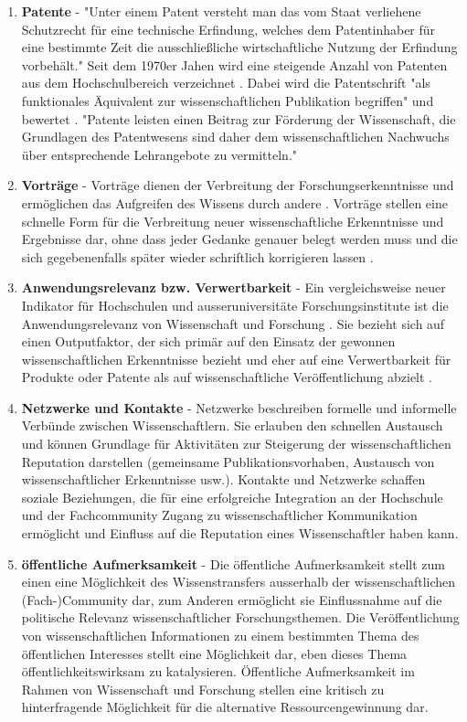\begin{enumerate}
\item \textbf{Patente} - "Unter einem Patent versteht man das vom Staat verliehene Schutzrecht für eine technische Erfindung, welches dem Patentinhaber für eine bestimmte Zeit die ausschließliche wirtschaftliche Nutzung der Erfindung vorbehält." \cite{greif_2003_patente} Seit dem 1970er Jahen wird eine steigende Anzahl von Patenten aus dem Hochschulbereich verzeichnet \cite{schmoch_2003_hochschulforschung}. Dabei wird die Patentschrift "als funktionales Äquivalent zur wissenschaftlichen Publikation begriffen" und bewertet \cite{mersch_2014_patente}. "Patente leisten einen Beitrag zur Förderung der Wissenschaft, die Grundlagen des Patentwesens sind daher dem wissenschaftlichen Nachwuchs über entsprechende Lehrangebote zu vermitteln." \cite{suchen}
\item \textbf{Vorträge} - Vorträge dienen der Verbreitung der Forschungserkenntnisse und ermöglichen das Aufgreifen des Wissens durch andere \cite{rassenhoevel_2010_performancemessung}. Vorträge stellen eine schnelle Form für die Verbreitung neuer wissenschaftliche Erkenntnisse und Ergebnisse dar, ohne dass jeder Gedanke genauer belegt werden muss und die sich gegebenenfalls später wieder schriftlich korrigieren lassen \cite{haberle_2002_jahrbuch}.
\item\textbf{Anwendungsrelevanz bzw. Verwertbarkeit} - Ein vergleichsweise neuer Indikator für Hochschulen und ausseruniversitäte Forschungsinstitute ist die Anwendungsrelevanz von Wissenschaft und Forschung \cite{simon_2009_wissenschaft_governance}. Sie bezieht sich auf einen Outputfaktor, der sich primär auf den Einsatz der gewonnen wissenschaftlichen Erkenntnisse bezieht und eher auf eine Verwertbarkeit für Produkte oder Patente als auf wissenschaftliche Veröffentlichung abzielt \cite{suchen}.
\item \textbf{Netzwerke und Kontakte} - Netzwerke beschreiben formelle und informelle Verbünde zwischen Wissenschaftlern. Sie erlauben den schnellen Austausch und können Grundlage für Aktivitäten zur Steigerung der wissenschaftlichen Reputation darstellen (gemeinsame Publikationsvorhaben, Austausch von wissenschaftlicher Erkenntnisse usw.). Kontakte und Netzwerke schaffen soziale Beziehungen, die für eine erfolgreiche Integration an der Hochschule und der Fachcommunity Zugang zu wissenschaftlicher Kommunikation ermöglicht und Einfluss auf die Reputation eines Wissenschaftler haben kann.
\item \textbf{öffentliche Aufmerksamkeit} - Die öffentliche Aufmerksamkeit stellt zum einen eine Möglichkeit des Wissenstransfers ausserhalb der wissenschaftlichen (Fach-)Community dar, zum Anderen ermöglicht sie Einflussnahme auf die politische Relevanz wissenschaftlicher Forschungsthemen. Die Veröffentlichung von wissenschaftlichen Informationen zu einem bestimmten Thema des öffentlichen Interesses stellt eine Möglichkeit dar, eben dieses Thema öffentlichkeitswirksam zu katalysieren. Öffentliche Aufmerksamkeit im Rahmen von Wissenschaft und Forschung stellen eine kritisch zu hinterfragende Möglichkeit für die alternative Ressourcengewinnung dar. \cite{suche}

\end{enumerate}
